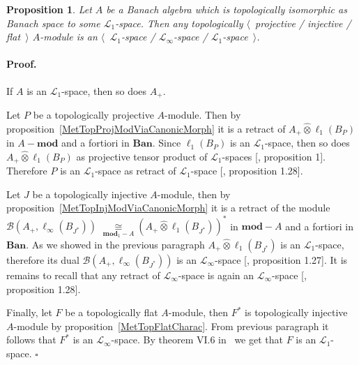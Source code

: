 \documentclass[12pt]{article}
\newcommand{\projtens}{\mathbin{\widehat{\otimes}}}
\newcommand{\isom}[1]{\mathop{\mathbin{\cong}}\limits_{#1}}
\newtheorem{proposition}[theorem]{Proposition}
\renewenvironment{proof}{\paragraph{Proof.}}{\hfill$\square$\medskip}
\begin{document}
\begin{proposition}\label{TopProjInjFlatModOverMthscrL1SpCharac} Let $A$ be a
    Banach algebra which is topologically isomorphic as Banach space to some
    $\mathscr{L}_1$-space. Then any topologically $\langle$~projective /
    injective / flat~$\rangle$ $A$-module is an $\langle$~$\mathscr{L}_1$-space
    / $\mathscr{L}_\infty$-space / $\mathscr{L}_1$-space~$\rangle$.
\end{proposition}
\begin{proof} If $A$ is an $\mathscr{L}_1$-space, then so does $A_+$.

    Let $P$ be a topologically projective $A$-module. Then by
    proposition~\ref{MetTopProjModViaCanonicMorph} it is a retract of
    $A_+\projtens \ell_1(B_P)$ in $A-\mathbf{mod}$ and a fortiori in $\mathbf{Ban}$.
    Since $\ell_1(B_P)$ is an $\mathscr{L}_1$-space, then so does
    $A_+\projtens\ell_1(B_P)$ as projective tensor product of
    $\mathscr{L}_1$-spaces [\cite{GonzDPPInTensProd}, proposition 1]. Therefore
    $P$ is an $\mathscr{L}_1$-space as retract of $\mathscr{L}_1$-space
    [\cite{BourgNewClOfLpSp}, proposition 1.28].

    Let $J$ be a topologically injective $A$-module, then by
    proposition~\ref{MetTopInjModViaCanonicMorph} it is a retract of the module
    $\mathcal{B}(A_+,\ell_\infty(B_{J^*}))$
    $\isom{\mathbf{mod}_1-A}{(A_+\projtens\ell_1(B_{J^*}))}^*$ in $\mathbf{mod}-A$ and a
    fortiori in $\mathbf{Ban}$. As we showed in the previous paragraph
    $A_+\projtens\ell_1(B_{J^*})$ is an $\mathscr{L}_1$-space, therefore its
    dual $\mathcal{B}(A_+,\ell_\infty(B_{J^*}))$ is an
    $\mathscr{L}_\infty$-space [\cite{BourgNewClOfLpSp}, proposition 1.27]. It
    is remains to recall that any retract of $\mathscr{L}_\infty$-space is again
    an $\mathscr{L}_\infty$-space [\cite{BourgNewClOfLpSp}, proposition 1.28].

    Finally, let $F$ be a topologically flat $A$-module, then $F^*$ is
    topologically injective $A$-module by proposition~\ref{MetTopFlatCharac}.
    From previous paragraph it follows that $F^*$ is an
    $\mathscr{L}_\infty$-space. By theorem VI.6 in~\cite{StegRethNucOpL1LInfSp}
    we get that $F$ is an $\mathscr{L}_1$-space.
\end{proof}
\end{document}

